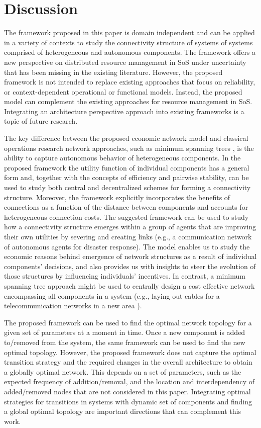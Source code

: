 \documentclass[journal,onecolumn]{IEEEtran}
\theoremstyle{plain}
\begin{document}
\section{Discussion}
\label{discussion}
The framework proposed in this paper is domain independent and can be applied in a variety of contexts to study the connectivity structure of systems of systems comprised of heterogeneous and autonomous components. The framework offers a new perspective on distributed resource management in SoS under uncertainty that has been missing in the existing literature. However, the proposed framework is not intended to replace existing approaches that focus on reliability, or context-dependent operational or functional models. Instead, the proposed model can complement the existing approaches for resource management in SoS. Integrating an architecture perspective approach into existing frameworks is a topic of future research.

The key difference between the proposed economic network model and classical operations research network approaches, such as minimum spanning trees \citep{kruskal1956shortest}, is the ability to capture autonomous behavior of heterogeneous components. In the proposed framework the utility function of individual components has a general form and, together with the concepts of efficiency and pairwise stability, can be used to study both central and decentralized schemes for forming a connectivity structure. Moreover, the framework explicitly incorporates the benefits of connections as a function of the distance between  components and accounts for heterogeneous connection costs. The suggested framework can be used to study how a connectivity structure emerges within a group of agents that are improving their own utilities by severing and creating links (e.g., a communication network of autonomous agents for disaster response). The model enables us to study the economic reasons behind emergence of network structures as a result of individual components' decisions, and also provides us with insights to steer the evolution of those structures by influencing individuals' incentives. In contrast, a minimum spanning tree approach might be used to centrally design a cost effective network encompassing all components in a system (e.g., laying out cables for a telecommunication networks in a new area \citep{graham1985history}). 

The proposed framework can be used to find the optimal network topology for a given set of parameters at a moment in time. Once a new component  is added to/removed from the system, the same framework can be used to find the new optimal topology. However, the proposed framework does not capture the optimal transition strategy and the required changes in the overall architecture to obtain a globally optimal network. This depends on a set of parameters, such as the expected frequency of addition/removal, and the location and interdependency of added/removed nodes that are not considered in this paper. Integrating optimal strategies for transitions in systems with dynamic set of components and finding a global optimal topology are important directions that can complement this work.
\end{document}
